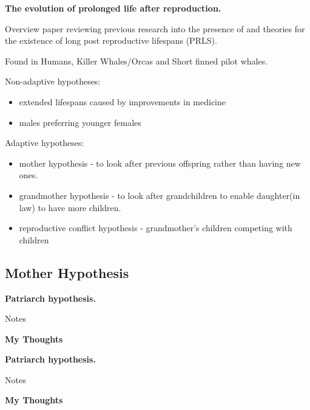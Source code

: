 \documentclass[authoryearcitations]{UoYCSproject}
\begin{document}
\begin{framed}
\noindent \textbf{The evolution of prolonged life after reproduction. \cite{evolutionPRLS2015}}

Overview paper reviewing previous research into the presence of and theories for the existence of long post reproductive lifespans (PRLS).

Found in Humans, Killer Whales/Orcas and Short finned pilot whales.

\noindent Non-adaptive hypotheses:
\begin{itemize}
    \item extended lifespans caused by improvements in medicine
    \item males preferring younger females
\end{itemize}

\noindent Adaptive hypotheses:
\begin{itemize}
    \item mother hypothesis - to look after previous offspring rather than having new ones.
    \item grandmother hypothesis - to look after grandchildren to enable daughter(in law) to have more children.
    \item reproductive conflict hypothesis - grandmother’s children competing with children
\end{itemize}
\end{framed}

\subsection{Mother Hypothesis}
\begin{framed}
\noindent \textbf{Patriarch hypothesis. \cite{patriarchHypothesis2000}}

Notes

\noindent \textbf{My Thoughts}


\end{framed}

\begin{framed}
\noindent \textbf{Patriarch hypothesis. \cite{patriarchHypothesis2000}}

Notes

\noindent \textbf{My Thoughts}


\end{framed}
\end{document}
